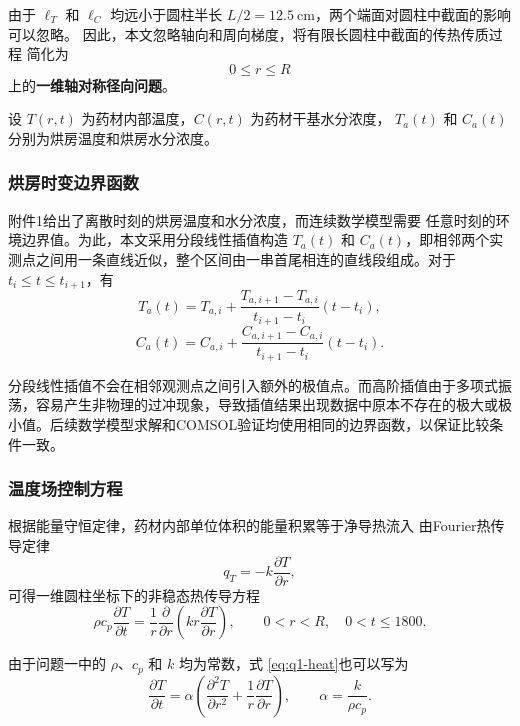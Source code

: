 \documentclass[12pt,a4paper]{article}
\renewcommand{\boxed}[1]{#1}
\begin{document}
由于 $\ell_T$ 和 $\ell_C$ 均远小于圆柱半长
$L/2=12.5\ \mathrm{cm}$，两个端面对圆柱中截面的影响可以忽略。
因此，本文忽略轴向和周向梯度，将有限长圆柱中截面的传热传质过程
简化为
\begin{equation}
0\le r\le R
\end{equation}
上的\textbf{一维轴对称径向问题}。

设 $T(r,t)$ 为药材内部温度，$C(r,t)$ 为药材干基水分浓度，
$T_a(t)$ 和 $C_a(t)$ 分别为烘房温度和烘房水分浓度。

\subsubsection{烘房时变边界函数}

附件1给出了离散时刻的烘房温度和水分浓度，而连续数学模型需要
任意时刻的环境边界值。为此，本文采用分段线性插值构造
$T_a(t)$ 和 $C_a(t)$，即相邻两个实测点之间用一条直线近似，整个区间由一串首尾相连的直线段组成。对于 $t_i\le t\le t_{i+1}$，有
\begin{equation}
T_a(t)
=
T_{a,i}
+
\frac{T_{a,i+1}-T_{a,i}}{t_{i+1}-t_i}
(t-t_i),
\end{equation}
\begin{equation}
C_a(t)
=
C_{a,i}
+
\frac{C_{a,i+1}-C_{a,i}}{t_{i+1}-t_i}
(t-t_i).
\end{equation}

分段线性插值不会在相邻观测点之间引入额外的极值点。而高阶插值由于多项式振荡，容易产生非物理的过冲现象，导致插值结果出现数据中原本不存在的极大或极小值。后续数学模型求解和COMSOL验证均使用相同的边界函数，以保证比较条件一致。

\subsubsection{温度场控制方程}

根据能量守恒定律，药材内部单位体积的能量积累等于净导热流入
由Fourier热传导定律
\begin{equation}
q_T=-k\frac{\partial T}{\partial r},
\end{equation}
可得一维圆柱坐标下的非稳态热传导方程
\begin{equation}
\boxed{
\rho c_p\frac{\partial T}{\partial t}
=
\frac{1}{r}
\frac{\partial}{\partial r}
\left(
kr\frac{\partial T}{\partial r}
\right)
},
\qquad
0<r<R,\quad 0<t\le1800.
\label{eq:q1-heat}
\end{equation}

由于问题一中的 $\rho$、$c_p$ 和 $k$ 均为常数，式
\eqref{eq:q1-heat}也可以写为
\begin{equation}
\frac{\partial T}{\partial t}
=
\alpha
\left(
\frac{\partial^2T}{\partial r^2}
+
\frac{1}{r}\frac{\partial T}{\partial r}
\right),
\qquad
\alpha=\frac{k}{\rho c_p}.
\end{equation}
\end{document}
